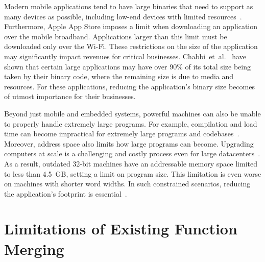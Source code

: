 Modern mobile applications tend to have large binaries that need to support as many devices as possible, including low-end devices with limited resources~\cite{hart02,etzo10}.
Furthermore, Apple App Store imposes a limit when downloading an application over the mobile broadband.
Applications larger than this limit must be downloaded only over the Wi-Fi.
These restrictions on the size of the application may significantly impact revenues for critical businesses.
Chabbi~et~al.~\cite{chabbi21} have shown that certain large applications may have over 90\%
of its total size being taken by their binary code, where the remaining size is due to media and resources.
For these applications, reducing the application's binary size becomes of utmost importance for their businesses.

Beyond just mobile and embedded systems, powerful machines can also be unable to properly handle extremely large programs.
For example, compilation and load time can become impractical for extremely large programs and codebases~\cite{haas17,jaspan18}.
Moreover, address space also limits how large programs can become.
Upgrading computers at scale is a challenging and costly process even for large datacenters~\cite{yan16,neamtiu11}.
As a result, outdated 32-bit machines have an addressable memory space limited to less than 4.5~GB, setting a limit on program size.
This limitation is even worse on machines with shorter word widths.
In such constrained scenarios, reducing the application's footprint is essential~\cite{schultz03,varma04,sehgal12,keoh14,auler17}.

\section{Limitations of Existing Function Merging}

